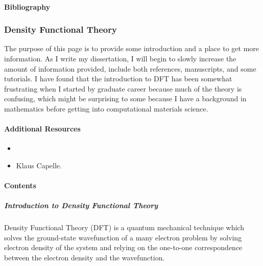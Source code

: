 \documentclass[letterpaper,10pt,english]{sphinxmanual}
\begin{document}
\paragraph{Bibliography}
\label{\detokenize{crystallography/index:bibliography}}





\subsubsection{Density Functional Theory}
\label{\detokenize{dft/index:density-functional-theory}}\label{\detokenize{dft/index::doc}}
The purpose of this page is to provide some introduction and a place to get more information.  As I write my dissertation, I will begin to slowly increase the amount of information provided, include both references, manuscripts, and some tutorials.  I have found that the introduction to DFT has been somewhat frustrating when I started by graduate career because much of the theory is confusing, which might be surprising to some because I have a background in mathematics before getting into computational materials science.


\paragraph{Additional Resources}
\label{\detokenize{dft/index:additional-resources}}\begin{itemize}
\item {} 

\item {} 
Klaus Capelle. 

\end{itemize}


\paragraph{Contents}
\label{\detokenize{dft/index:contents}}

\subparagraph{Introduction to Density Functional Theory}
\label{\detokenize{dft/dft_intro:introduction-to-density-functional-theory}}\label{\detokenize{dft/dft_intro::doc}}
Density Functional Theory (DFT) is a quantum mechanical technique which solves the ground-state wavefunction of a many electron problem by solving electron density of the system and relying on the one-to-one correspondence between the electron density and the wavefunction.
\end{document}
